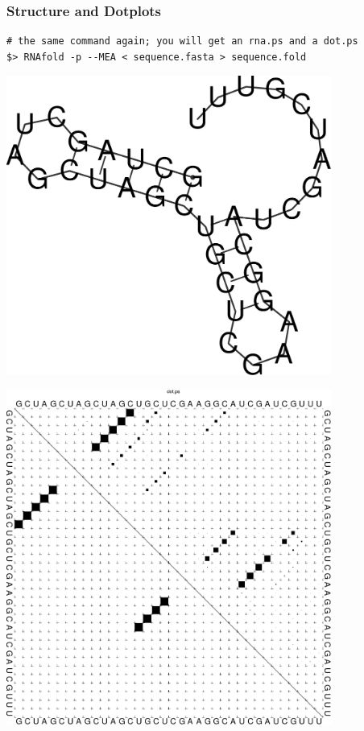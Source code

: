 \begin{frame}[c,fragile]\frametitle{Structure and Dotplots}
  
  \begin{lstlisting}
# the same command again; you will get an rna.ps and a dot.ps
$> RNAfold -p --MEA < sequence.fasta > sequence.fold
  \end{lstlisting}
  

  \begin{minipage}{0.4\textwidth}
      \includegraphics[width=0.8\textwidth]{figures/rna.pdf}
  \end{minipage} \hfill \begin{minipage}{0.4\textwidth}
      \includegraphics[width=0.8\textwidth]{figures/dot.pdf}
  \end{minipage}
\end{frame}


